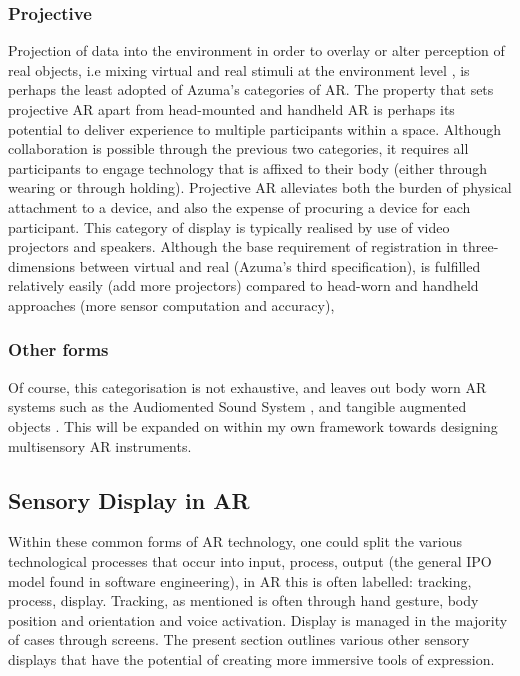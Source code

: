 \subsubsection{Projective}\label{sec: literature-interface-forms-proj}
Projection of data into the environment in order to overlay or alter perception of real objects, i.e mixing virtual and real stimuli at the environment level \citep{lindeman2007}, is perhaps the least adopted of Azuma's categories of AR. The property that sets projective AR apart from head-mounted and handheld AR is perhaps its potential to deliver experience to multiple participants within a space. Although collaboration is possible through the previous two categories, it requires all participants to engage technology that is affixed to their body (either through wearing or through holding). Projective AR alleviates both the burden of physical attachment to a device, and also the expense of procuring a device for each participant. This category of display is typically realised by use of video projectors and speakers. Although the base requirement of registration in three-dimensions between virtual and real (Azuma's third specification), is fulfilled relatively easily (add more projectors) compared to head-worn and handheld approaches (more sensor computation and accuracy), 

\subsubsection{Other forms}\label{sec: literature-interface-forms-other}
Of course, this categorisation is not exhaustive, and leaves out body worn AR systems such as the Audiomented Sound System \citep{chevalier2020}, and tangible augmented objects \citep{schraffenberger2015}. This will be expanded on within my own framework towards designing multisensory AR instruments.



\subsection{Sensory Display in AR}\label{sec: literature-interface-sensory}
Within these common forms of AR technology, one could split the various technological processes that occur into input, process, output (the general IPO model found in software engineering), in AR this is often labelled: tracking, process, display. Tracking, as mentioned is often through hand gesture, body position and orientation and voice activation. Display is managed in the majority of cases through screens. The present section outlines various other sensory displays that have the potential of creating more immersive tools of expression.

